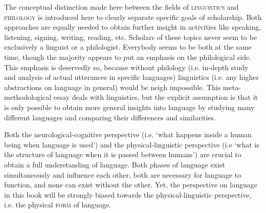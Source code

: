
%
The conceptual distinction made here between the fields of \textsc{linguistics} and \textsc{philology} is introduced here to clearly separate specific goals of scholarship. Both approaches are equally needed to obtain further insight in activities like speaking, listening, signing, writing, reading, etc. Scholars of these topics never seem to be exclusively a linguist or a philologist. Everybody seems to be both at the same time, though the majority appears to put an emphasis on the philological side. This emphasis is deservedly so, because without philology (i.e. in-depth study and analysis of actual utterances in specific languages) linguistics (i.e. any higher abstractions on language in general) would be neigh impossible. This meta-methodological essay deals with linguistics, but the explicit assumption is that it is only possible to obtain more general insights into language by studying many different languages and comparing their differences and similarities. 


%
Both the neurological-cognitive perspective (i.e. `what happens inside a human being when language is used') and the physical-linguistic perspective (i.e `what is the structure of language when it is passed between humans') are crucial to obtain a full understanding of language. Both phases of language exist simultaneously and influence each other, both are necessary for language to function, and none can exist without the other. Yet, the perspective on language in this book will be strongly biased towards the physical-linguistic perspective, i.e. the physical \textsc{form} of language.

